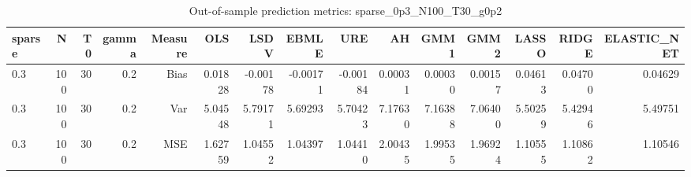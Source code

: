 \begin{table}[!htbp]\centering
\caption{Out-of-sample prediction metrics: sparse_0p3_N100_T30_g0p2}
\label{tab:table3_sparse_0p3_N100_T30_g0p2}
\begin{tabular}{lrrrrrrrrrrrrrr}
\hline
sparse & N & T0 & gamma & Measure & OLS & LSDV & EBMLE & URE & AH & GMM1 & GMM2 & LASSO & RIDGE & ELASTIC_NET \\
\hline
0.3 & 100 & 30 & 0.2 & Bias & 0.01828 & -0.00178 & -0.00171 & -0.00184 & 0.00031 & 0.00030 & 0.00157 & 0.04613 & 0.04700 & 0.04629 \\
0.3 & 100 & 30 & 0.2 & Var & 5.04548 & 5.79171 & 5.69293 & 5.70423 & 7.17630 & 7.16388 & 7.06400 & 5.50259 & 5.42946 & 5.49751 \\
0.3 & 100 & 30 & 0.2 & MSE & 1.62759 & 1.04552 & 1.04397 & 1.04410 & 2.00435 & 1.99535 & 1.96924 & 1.10555 & 1.10862 & 1.10546 \\
\hline
\end{tabular}
\end{table}

